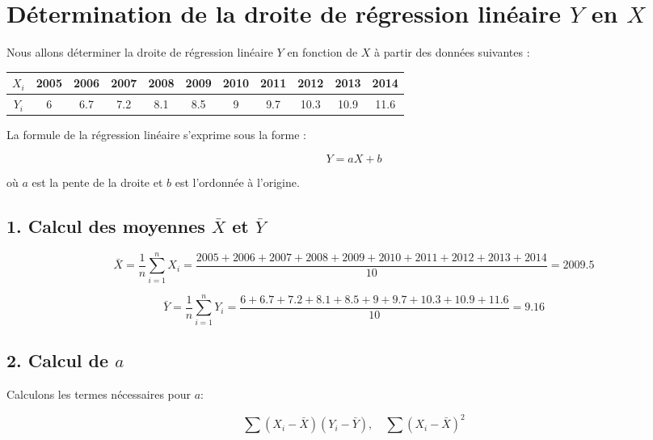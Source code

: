 \documentclass[12pt]{article}
\begin{document}
\section*{Détermination de la droite de régression linéaire \(Y\) en \(X\)}

Nous allons déterminer la droite de régression linéaire \(Y\) en fonction de \(X\) à partir des données suivantes :

\begin{table}[h]
    \centering
    \begin{tabular}{|c|c|c|c|c|c|c|c|c|c|c|}
        \hline
        \(X_{i}\) & 2005 & 2006 & 2007 & 2008 & 2009 & 2010 & 2011 & 2012 & 2013 & 2014 \\
        \hline
        \(Y_{i}\) & 6 & 6.7 & 7.2 & 8.1 & 8.5 & 9 & 9.7 & 10.3 & 10.9 & 11.6 \\
        \hline
    \end{tabular}
\end{table}

La formule de la régression linéaire s'exprime sous la forme :

\[
Y = aX + b
\]

où \(a\) est la pente de la droite et \(b\) est l'ordonnée à l'origine.

\subsection*{1. Calcul des moyennes \(\bar{X}\) et \(\bar{Y}\)}

\[
\bar{X} = \frac{1}{n} \sum_{i=1}^{n} X_i = \frac{2005 + 2006 + 2007 + 2008 + 2009 + 2010 + 2011 + 2012 + 2013 + 2014}{10} = 2009.5
\]

\[
\bar{Y} = \frac{1}{n} \sum_{i=1}^{n} Y_i = \frac{6 + 6.7 + 7.2 + 8.1 + 8.5 + 9 + 9.7 + 10.3 + 10.9 + 11.6}{10} = 9.16
\]

\subsection*{2. Calcul de \(a\)}

Calculons les termes nécessaires pour \(a\):

\[
\sum (X_i - \bar{X})(Y_i - \bar{Y}), \quad \sum (X_i - \bar{X})^2
\]
\end{document}
